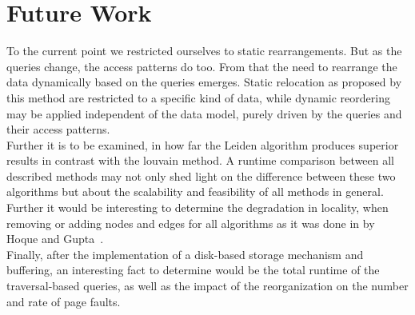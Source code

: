\section{Future Work}\label{\positionnumber}
To the current point we restricted ourselves to static rearrangements.
But as the queries change, the access patterns do too.
From that the need to rearrange the data dynamically based on the queries emerges.
Static relocation as proposed by this method are restricted to a specific kind of data, while dynamic reordering may be applied independent of the data model, purely driven by the queries and their access patterns. \\
Further it is to be examined, in how far the Leiden algorithm produces superior results in contrast with the louvain method. 
A runtime comparison between all described methods may not only shed light on the difference between these two algorithms but about the scalability and feasibility of all methods in general. \\
Further it would be interesting to determine the degradation in locality, when removing or adding nodes and edges for all algorithms as it was done in by Hoque and Gupta~\autocite{hoque2012disk}. \\
Finally, after the implementation of a disk-based storage mechanism and buffering, an interesting fact to determine would be the total runtime of the traversal-based queries, as well as the impact of the reorganization on the number and rate of page faults.

